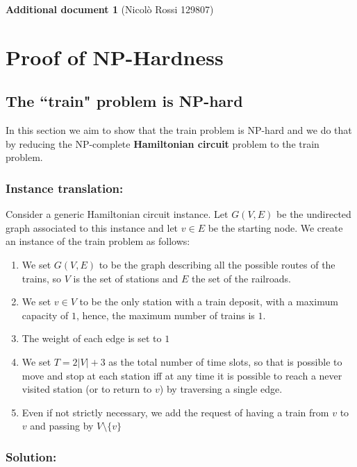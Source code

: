\documentclass[12pt]{article}
\begin{document}
\newtheorem{Definizione}{Definizione}
\newtheorem{Lemma}{Lemma}
\newtheorem{Teorema}{Teorema}




\textbf{Additional document 1} (Nicolò Rossi 129807)

\section{Proof of NP-Hardness}
\subsection{The ``train" problem is NP-hard}

In this section we aim to show that the train problem is NP-hard and we do that by reducing the NP-complete \textbf{Hamiltonian circuit} problem to the train problem.

\subsubsection{Instance translation: }

Consider a generic Hamiltonian circuit instance. Let $G(V,E)$ be the undirected graph associated to this instance and 
let $v \in E$ be the starting node. We create an instance of the train problem as follows:

\begin{enumerate}


\item We set $G(V,E)$ to be the graph describing all the possible routes of the trains, so $V$ is the set of stations and $E$ the set of the railroads.
\item We set $v\in V$ to be the only station with a train deposit, with a maximum capacity of $1$, hence, the maximum number of trains is $1$.
\item The weight of each edge is set to $1$
\item We set $T=2|V|+3$ as the total number of time slots, so that is possible to move and stop at each station iff at any time it is possible to reach a never visited station (or to return to $v$) by traversing a single edge.   
\item Even if not strictly necessary, we add the request of having a train from $v$ to $v$ and passing by $V\setminus \{v\}$
\end{enumerate}

\subsubsection{Solution:}
\end{document}
